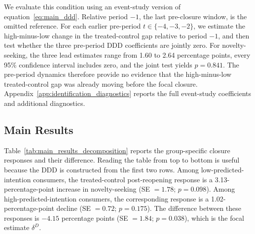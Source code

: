 \documentclass[11 pt]{article}
\begin{document}
We evaluate this condition using an event-study version of equation~\eqref{eq:main_ddd}. Relative period $-1$, the last pre-closure window, is the omitted reference. For each earlier pre-period $t\in\{-4,-3,-2\}$, we estimate the high-minus-low change in the treated-control gap relative to period $-1$, and then test whether the three pre-period DDD coefficients are jointly zero. For novelty-seeking, the three lead estimates range from 1.60 to 2.64 percentage points, every 95\% confidence interval includes zero, and the joint test yields $p=0.841$. The pre-period dynamics therefore provide no evidence that the high-minus-low treated-control gap was already moving before the focal closure. Appendix~\ref{app:identification_diagnostics} reports the full event-study coefficients and additional diagnostics.



\subsection{Main Results}
\label{section:Main Results}

Table~\ref{tab:main_results_decomposition} reports the group-specific closure responses and their difference. Reading the table from top to bottom is useful because the DDD is constructed from the first two rows. Among low-predicted-intention consumers, the treated-control post-reopening response is a 3.13-percentage-point increase in novelty-seeking (SE $=1.78$; $p=0.098$). Among high-predicted-intention consumers, the corresponding response is a 1.02-percentage-point decline (SE $=0.72$; $p=0.175$). The difference between these responses is $-4.15$ percentage points (SE $=1.84$; $p=0.038$), which is the focal estimate $\delta^D$.
\end{document}
